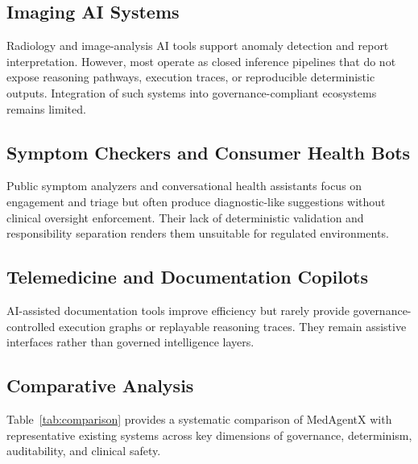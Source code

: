 \documentclass[conference]{IEEEtran}
\begin{document}
\subsection{Imaging AI Systems}
Radiology and image-analysis AI tools support anomaly detection and report interpretation. However, most operate as closed inference pipelines that do not expose reasoning pathways, execution traces, or reproducible deterministic outputs. Integration of such systems into governance-compliant ecosystems remains limited.

\subsection{Symptom Checkers and Consumer Health Bots}
Public symptom analyzers and conversational health assistants focus on engagement and triage but often produce diagnostic-like suggestions without clinical oversight enforcement. Their lack of deterministic validation and responsibility separation renders them unsuitable for regulated environments.

\subsection{Telemedicine and Documentation Copilots}
AI-assisted documentation tools improve efficiency but rarely provide governance-controlled execution graphs or replayable reasoning traces. They remain assistive interfaces rather than governed intelligence layers.

\subsection{Comparative Analysis}
Table~\ref{tab:comparison} provides a systematic comparison of MedAgentX with representative existing systems across key dimensions of governance, determinism, auditability, and clinical safety.
\end{document}
